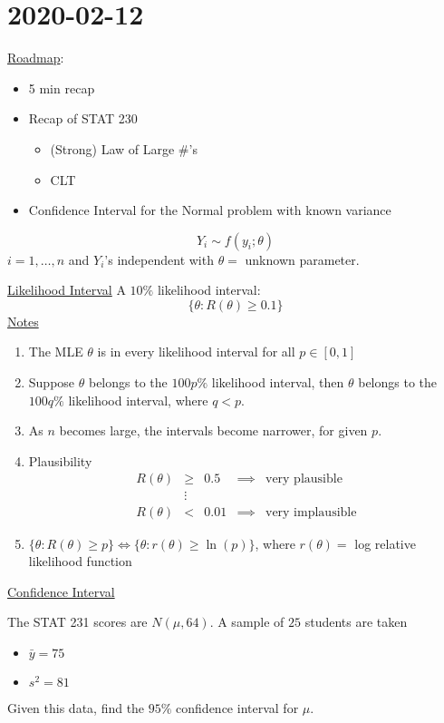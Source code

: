 \section{2020-02-12}
\underline{Roadmap}:
\begin{itemize}
    \item 5 min recap
    \item Recap of STAT 230
          \begin{itemize}
              \item (Strong) Law of Large \#'s
              \item CLT
          \end{itemize}
    \item Confidence Interval for the Normal problem with known variance
\end{itemize}
\[ Y_i \sim f(y_i;\theta) \]
$ i=1,\ldots ,n $ and $ Y_i $'s independent with $ \theta= $ unknown parameter.

\underline{Likelihood Interval}
A $ 10\% $ likelihood interval:
\[ \{\theta:R(\theta)\geqslant 0.1\} \]
\underline{Notes}
\begin{enumerate}[label=(\roman*)]
    \item The MLE $ \theta $ is in every likelihood interval for all $ p\in[0,1] $
    \item Suppose $ \theta $ belongs to the $ 100p\% $ likelihood interval, then
          $ \theta $ belongs to the $ 100q\% $ likelihood interval, where $ q<p $.
    \item As $ n $ becomes large, the intervals become narrower, for given $ p $.
    \item Plausibility
          \[
              \begin{array}{ccccc}
                  R(\theta) & \geqslant & 0.5  & \implies & \text{very plausible}   \\
                            & \vdots    &                                           \\
                  R(\theta) & <         & 0.01 & \implies & \text{very implausible}
              \end{array}
          \]
    \item $ \{\theta:R(\theta)\geqslant p\}\iff \{\theta:r(\theta)\geqslant \ln(p)\} $,
          where $ r(\theta) = $ log relative likelihood function
\end{enumerate}
\underline{Confidence Interval}

\begin{Example}{}{}
    The STAT 231 scores are $ N(\mu,64) $. A sample of $ 25 $ students are
    taken
    \begin{itemize}
        \item $ \bar{y}=75 $
        \item $ s^2=81 $
    \end{itemize}
    Given this data, find the $ 95\% $ confidence interval for $ \mu $.
\end{Example}

